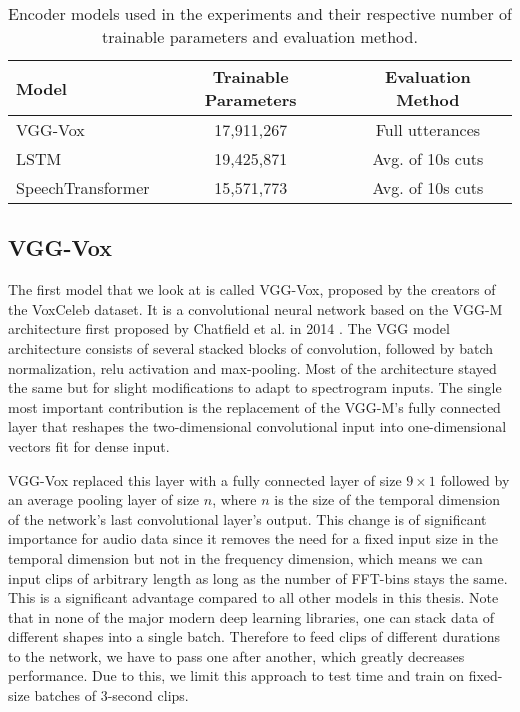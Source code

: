 \begin{table}[htpb]
  \centering
  \begin{tabular}{l c c}
    \toprule
        Model & Trainable Parameters & Evaluation Method \\
        \midrule
        VGG-Vox & 17,911,267 & Full utterances \\
        LSTM & 19,425,871 & Avg. of 10s cuts \\
        SpeechTransformer & 15,571,773 & Avg. of 10s cuts \\
    \bottomrule
  \end{tabular}
  \caption[Encoder Models]{Encoder models used in the experiments and their respective number of trainable parameters and evaluation method.}\label{tab:models}
\end{table}

\subsection{VGG-Vox}\label{sec:vggvox}

The first model that we look at is called VGG-Vox, proposed by the creators of the VoxCeleb dataset. It is a convolutional neural network based on the VGG-M architecture first proposed by Chatfield et al. in 2014 \cite{chatfield2014return}. The VGG model architecture consists of several stacked blocks of convolution, followed by batch normalization, \gls{relu} activation and max-pooling. Most of the architecture stayed the same but for slight modifications to adapt to spectrogram inputs. The single most important contribution is the replacement of the VGG-M’s fully connected layer that reshapes the two-dimensional convolutional input into one-dimensional vectors fit for dense input.

VGG-Vox replaced this layer with a fully connected layer of size $9\times1$ followed by an average pooling layer of size $n$, where $n$ is the size of the temporal dimension of the network's last convolutional layer's output. This change is of significant importance for audio data since it removes the need for a fixed input size in the temporal dimension but not in the frequency dimension, which means we can input clips of arbitrary length as long as the number of FFT-bins stays the same. This is a significant advantage compared to all other models in this thesis. Note that in none of the major modern deep learning libraries, one can stack data of different shapes into a single batch. Therefore to feed clips of different durations to the network, we have to pass one after another, which greatly decreases performance. Due to this, we limit this approach to test time and train on fixed-size batches of 3-second clips.

